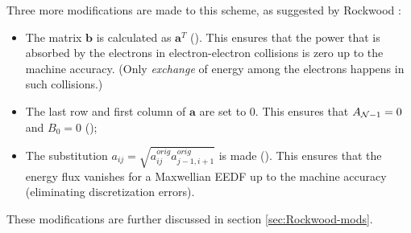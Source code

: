 \documentclass{book}
\newcommand{\bmat}[1]{{\ensuremath{\bm {#1}}}}
\begin{document}
Three more modifications are made to this scheme, as suggested by Rockwood
\cite[Appendix B]{Rockwood1973}:
\begin{itemize}
  \item The matrix $\bmat{b}$ is calculated as $\bmat{a}^T$
	(\cite[eq. B8,B9]{Rockwood1973}). This ensures that the power
	that is absorbed by the electrons in electron-electron collisions
	is zero up to the machine accuracy. (Only {\em exchange} of energy
	among the electrons happens in such collisions.)
  \item The last row and first column of $\bmat{a}$ are set to 0. This ensures
	that $A_{{\cal N}-1}=0$ and $B_0=0$ (\cite[eq. B10]{Rockwood1973});
  \item The substitution $a_{ij} = \sqrt{a^{orig}_{ij}a^{orig}_{j-1,i+1}}$ is made
	(\cite[eq. B11,B13]{Rockwood1973}). This ensures that the energy
	flux vanishes for a Maxwellian EEDF up to the machine accuracy
	(eliminating discretization errors).
\end{itemize}
These modifications are further discussed in section \ref{sec:Rockwood-mods}.
\end{document}
